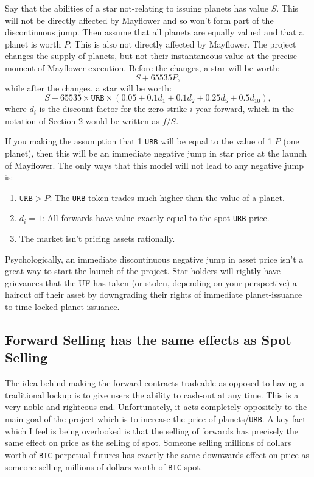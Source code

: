 \documentclass{article}
\begin{document}
	Say that the abilities of a star not-relating to issuing planets has value $S$. This will not be directly affected by Mayflower and so won't form part of the discontinuous jump. Then assume that all planets are equally valued and that a planet is worth $P$. This is also not directly affected by Mayflower. The project changes the supply of planets, but not their instantaneous value at the precise moment of Mayflower execution. Before the changes, a star will be worth:
	\begin{equation}
		S + 65535P,
	\end{equation}
	while after the changes, a star will be worth:
	\begin{equation}
		S + 65535\times\texttt{URB}\times (0.05 + 0.1d_1 + 0.1d_2 + 0.25d_5 + 0.5d_{10}),
	\end{equation}
	where $d_i$ is the discount factor for the zero-strike $i$-year  forward, which in the notation of Section 2 would be written as $f/S$.
	
	If you making the assumption that 1 \texttt{URB} will be equal to the value of 1 $P$ (one planet), then this will be an immediate negative jump in star price at the launch of Mayflower. The only ways that this model will not lead to any negative jump is: 
	\begin{enumerate}
		\item $\texttt{URB} > P$: The \texttt{URB} token trades much higher than the value of a planet.
		\item $d_i = 1$: All forwards have value exactly equal to the spot \texttt{URB} price.
		\item The market isn't pricing assets rationally.
	\end{enumerate}
	
	Psychologically, an immediate discontinuous negative jump in asset price isn't a great way to start the launch of the project. Star holders will rightly have grievances that the UF has taken (or stolen, depending on your perspective) a haircut off their asset by downgrading their rights of immediate planet-issuance to time-locked planet-issuance.
	
	\subsection{Forward Selling has the same effects as Spot Selling}
	The idea behind making the forward contracts tradeable as opposed to having a traditional lockup is to give users the ability to cash-out at any time. This is a very noble and righteous end. Unfortunately, it acts completely oppositely to the main goal of the project which is to increase the price of planets/\texttt{URB}. A key fact which I feel is being overlooked is that the selling of forwards has precisely the same effect on price as the selling of spot. Someone selling millions of dollars worth of \texttt{BTC} perpetual futures has exactly the same downwards effect on price as someone selling millions of dollars worth of \texttt{BTC} spot.
	
\end{document}
